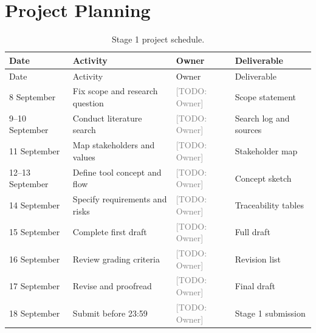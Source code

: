 \documentclass[11pt,a4paper]{article}
\newcommand{\placeholder}[1]{\textcolor{gray}{[TODO: #1]}}
\begin{document}
\clearpage
\section{Project Planning}

\begin{longtable}{@{}p{}p{}p{}p{}@{}}
\caption{Stage 1 project schedule.}\\
\toprule
Date & Activity & Owner & Deliverable \\
\midrule
\endfirsthead
\toprule
Date & Activity & Owner & Deliverable \\
\midrule
\endhead
8 September & Fix scope and research question & \placeholder{Owner} & Scope statement \\
9--10 September & Conduct literature search & \placeholder{Owner} & Search log and sources \\
11 September & Map stakeholders and values & \placeholder{Owner} & Stakeholder map \\
12--13 September & Define tool concept and flow & \placeholder{Owner} & Concept sketch \\
14 September & Specify requirements and risks & \placeholder{Owner} & Traceability tables \\
15 September & Complete first draft & \placeholder{Owner} & Full draft \\
16 September & Review grading criteria & \placeholder{Owner} & Revision list \\
17 September & Revise and proofread & \placeholder{Owner} & Final draft \\
18 September & Submit before 23:59 & \placeholder{Owner} & Stage 1 submission \\
\bottomrule
\end{longtable}
\end{document}
